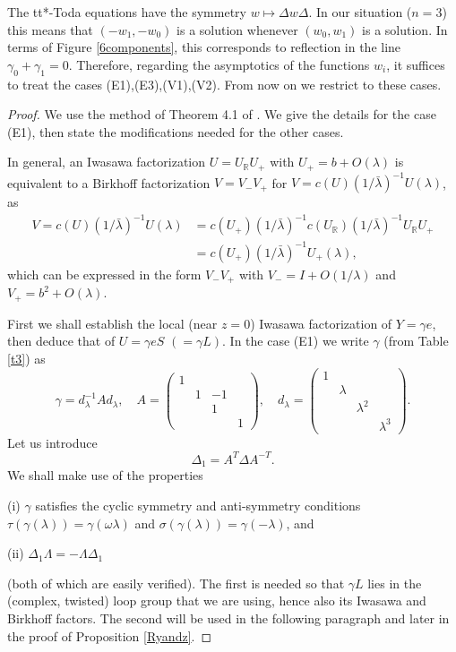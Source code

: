 \documentclass[a4paper,12pt,leqno]{amsart}
\numberwithin{equation}{section}
\theoremstyle{plain}
\theoremstyle{definition}
\newcommand{\R}{\mathbb R}
\newcommand{\ga}{\gamma}
\newcommand{\la}{\lambda}
\newcommand{\si}{\sigma}
\newcommand{\De}{\Delta}
\newcommand{\om}{\omega}
\newcommand{\no}{\noindent}
\newcommand{\bsp}{\left(\begin{smallmatrix}}
\newcommand{\esp}{\end{smallmatrix}\right)}
\newcommand{\MM}{\Lambda}
\newcommand{\gazi}{\gamma}
\begin{document}
{\no{\em Note $2$.\ } The tt*-Toda equations have the symmetry $w\mapsto \De w\De$. In our situation ($n=3$) this means that $(-w_1,-w_0)$ is a solution whenever $(w_0,w_1)$ is a solution. In terms of  
Figure \ref{6components}, this corresponds to reflection in the line $\ga_0+\ga_1=0$. Therefore, regarding the asymptotics of the functions $w_i$, it suffices to treat the cases (E1),(E3),(V1),(V2). From now on we restrict to these cases.

\begin{proof}  We use the method of Theorem 4.1 of \cite{DoGuRo10}.  We give the details for the case (E1), then state the modifications needed for the other cases.  

In general, an Iwasawa factorization $U=U_\R U_+$
with $U_+=b+O(\la)$ is equivalent to a Birkhoff factorization $V=V_-V_+$ for $V=c(U)(1/\bar\la)^{-1} U(\la)$, as
\begin{align*}
V=c(U)(1/\bar\la)^{-1} U(\la) &= c(U_+)(1/\bar\la)^{-1} c(U_\R)(1/\bar\la)^{-1} U_\R U_+ 
\\
&= 
c(U_+)(1/\bar\la)^{-1} U_+(\la),
\end{align*}
which can be expressed in the form $V_-V_+$ with $V_-=I+O(1/\la)$ and $V_+=b^2+O(\la)$.

First we shall establish the local (near $z=0$) Iwasawa factorization of $Y=\gazi  e$,
then deduce that of $U=\gazi  eS$ $(=\gazi L)$.
In the case (E1) we write $\gazi$ (from Table \ref{t3}) as
\[
\gazi=d_\la^{-1}Ad_\la,
\quad
A=
\bsp
1 & & & \\
 & 1 & -1& \\
 & & 1 & \\
 & & &1
\esp,
\quad
d_\la=
\bsp
1 & & & \\
 & \la & & \\
 & & \la^2 & \\
 & & &\!\!\la^3
\esp.
\]
Let us introduce
\begin{equation}\label{Delta1}
\De_1=A^T \De A^{-T}.
\end{equation}
We shall make use of the properties

(i) $\gazi$ satisfies the cyclic symmetry and anti-symmetry conditions 
$\tau(\gazi(\la))=\gazi(\om\la)$ and $\si(\gazi(\la))=\gazi(-\la)$, and

(ii) $\De_1\MM=-\MM\De_1$

\no(both of which are easily verified). The first is needed so that 
$\gazi L$ lies in the (complex, twisted) loop group that we are using,  hence also its Iwasawa and Birkhoff factors. The second will be used in the following paragraph and later in the proof of Proposition \ref{Ryandz}.


\end{proof}}
\end{document}
